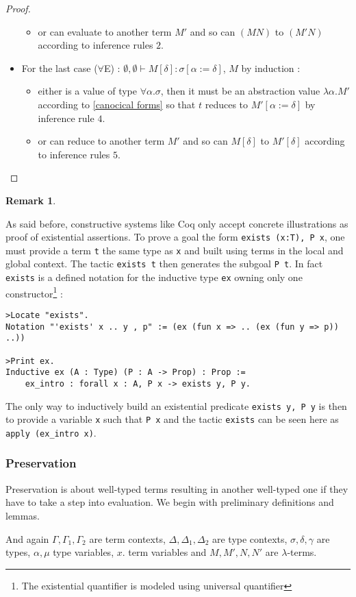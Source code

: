 \documentclass{article}
\newtheorem*{remark}{Remark}
\begin{document}
\begin{proof}
\begin{itemize}
\begin{itemize}
\begin{itemize}
            \end{itemize}
            \item or can evaluate to another term $M'$ and so can $(M N)$ to $(M' N)$ according to inference rules $2$.
        \end{itemize}
        \item  For the last case ($\forall$E) : $\emptyset,\emptyset\vdash M[\delta]:\sigma[\alpha:=\delta]$, $M$ by induction :
        \begin{itemize}
            \item either is a value of type $\forall\alpha.\sigma$, then it must be an abstraction value $\lambda \alpha .M'$ according to 
            \ref{canocical forms}  so that $t$ reduces to $M'[\alpha:=\delta]$ by inference rule $4$.
            \item or can reduce to another term $M'$ and so can $M[\delta]$ to $M'[\delta]$ according to inference rules $5$.
        \end{itemize}
        \end{itemize}
        
    \end{proof}

\begin{remark}\end{remark}
    As said before, constructive systems like Coq only accept concrete illustrations as proof of existential assertions. To prove a goal the form  \texttt{exists (x:T), P x}, one must provide a term \texttt{t} the same type as \texttt{x} and built using terms in the local and global context. The tactic \texttt{exists t} then generates the subgoal \texttt{P t}. In fact \texttt{exists} is a defined notation for the inductive type \texttt{ex} owning only one constructor\footnote{The existential quantifier is modeled using universal quantifier} :\begin{verbatim}
>Locate "exists".
Notation "'exists' x .. y , p" := (ex (fun x => .. (ex (fun y => p)) ..))

>Print ex.
Inductive ex (A : Type) (P : A -> Prop) : Prop :=
    ex_intro : forall x : A, P x -> exists y, P y.
    \end{verbatim}The only way to inductively build an existential predicate \texttt{exists y, P y} is then to provide a variable \texttt{x} such that \texttt{P x} and the tactic \texttt{exists} can be seen here as \texttt{apply (ex\_intro x)}.
    


    \subsubsection{Preservation}
    Preservation is about well-typed terms resulting in another well-typed one if they have to take a step into evaluation. We begin with preliminary definitions and lemmas.\par And again  $\Gamma, \Gamma_1, \Gamma_2$ are term contexts, $\Delta, \Delta_1,\Delta_2$ are type contexts, $\sigma, \delta, \gamma$ are types, $\alpha, \mu$ type variables, $x.$ term variables and $M, M', N, N'$ are $\lambda$-terms.
\end{document}
